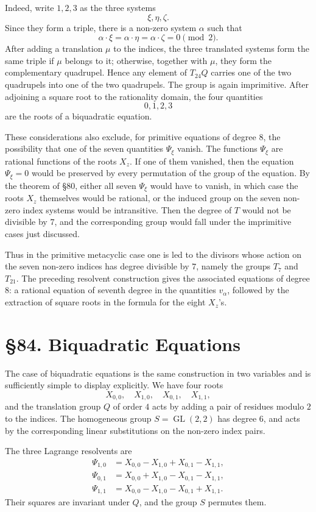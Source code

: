 \documentclass[12pt,a4paper]{article}
\newcommand{\webersection}[2]{\section*{\S #1. #2}\addcontentsline{toc}{section}{\S #1. #2}}
\newcommand{\GL}{\operatorname{GL}}
\begin{document}
Indeed, write \(1,2,3\) as the three systems
\[
 \xi,\eta,\zeta.
\]
Since they form a triple, there is a non-zero system \(\alpha\) such that
\[
 \alpha\cdot\xi=\alpha\cdot\eta=\alpha\cdot\zeta=0\pmod2.
\]
After adding a translation \(\mu\) to the indices, the three translated systems form the same triple if \(\mu\) belongs to it; otherwise, together with \(\mu\), they form the complementary quadrupel.  Hence any element of \(T_{24}Q\) carries one of the two quadrupels into one of the two quadrupels.  The group is again imprimitive.  After adjoining a square root to the rationality domain, the four quantities
\[
 0,1,2,3
\]
are the roots of a biquadratic equation.

These considerations also exclude, for primitive equations of degree \(8\), the possibility that one of the seven quantities \(\Psi_\xi\) vanish.  The functions \(\Psi_\xi\) are rational functions of the roots \(X_z\).  If one of them vanished, then the equation \(\Psi_\xi=0\) would be preserved by every permutation of the group of the equation.  By the theorem of \S 80, either all seven \(\Psi_\xi\) would have to vanish, in which case the roots \(X_z\) themselves would be rational, or the induced group on the seven non-zero index systems would be intransitive.  Then the degree of \(T\) would not be divisible by \(7\), and the corresponding group would fall under the imprimitive cases just discussed.

Thus in the primitive metacyclic case one is led to the divisors whose action on the seven non-zero indices has degree divisible by \(7\), namely the groups \(T_7\) and \(T_{21}\).  The preceding resolvent construction gives the associated equations of degree \(8\): a rational equation of seventh degree in the quantities \(v_\alpha\), followed by the extraction of square roots in the formula for the eight \(X_z\)'s.

\webersection{84}{Biquadratic Equations}

The case of biquadratic equations is the same construction in two variables and is sufficiently simple to display explicitly.  We have four roots
\[
 X_{0,0},\quad X_{1,0},\quad X_{0,1},\quad X_{1,1},
\]
and the translation group \(Q\) of order \(4\) acts by adding a pair of residues modulo \(2\) to the indices.  The homogeneous group \(S=\GL(2,2)\) has degree \(6\), and acts by the corresponding linear substitutions on the non-zero index pairs.

The three Lagrange resolvents are
\[
\begin{aligned}
 \Psi_{1,0}&=X_{0,0}-X_{1,0}+X_{0,1}-X_{1,1},\\
 \Psi_{0,1}&=X_{0,0}+X_{1,0}-X_{0,1}-X_{1,1},\\
 \Psi_{1,1}&=X_{0,0}-X_{1,0}-X_{0,1}+X_{1,1}.
\end{aligned}
\]
Their squares are invariant under \(Q\), and the group \(S\) permutes them.
\end{document}

